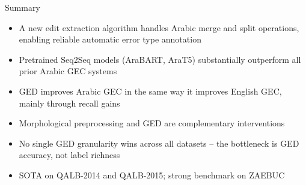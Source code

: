 \documentclass[aspectratio=169]{beamer}
\begin{document}
\begin{frame}{Summary}
  \begin{itemize}
    \item A new edit extraction algorithm handles Arabic merge and split
      operations, enabling reliable automatic error type annotation\\[0.8em]
    \item Pretrained Seq2Seq models (AraBART, AraT5) substantially
      outperform all prior Arabic GEC systems\\[0.8em]
    \item GED improves Arabic GEC in the same way it improves English GEC,
      mainly through recall gains\\[0.8em]
    \item Morphological preprocessing and GED are complementary interventions\\[0.8em]
    \item No single GED granularity wins across all datasets -- the bottleneck
      is GED accuracy, not label richness\\[0.8em]
    \item SOTA on QALB-2014 and QALB-2015; strong benchmark on ZAEBUC
  \end{itemize}
\end{frame}
\end{document}
